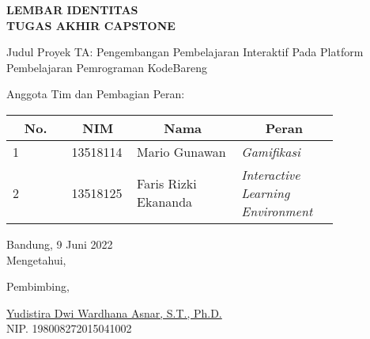 \clearpage
\pagestyle{empty}

\begin{center}
  \smallskip

  \Large \bfseries \MakeUppercase{Lembar Identitas \\ Tugas Akhir Capstone}
  \vspace{\baselineskip}

  \normalsize \normalfont
  \begin{flushleft}
    Judul Proyek TA\qquad: Pengembangan Pembelajaran Interaktif Pada Platform Pembelajaran Pemrograman KodeBareng
    \medskip

    Anggota Tim dan Pembagian Peran:
    \bigskip
  \end{flushleft}

  \begin{center}
    \begin{tabular}{ |l|p{0.2\linewidth}|p{0.325\linewidth}|p{0.3\linewidth}| }
      \hline
      \multicolumn{1}{|c|}{\textbf{No.}} & \multicolumn{1}{c|}{\textbf{NIM}} & \multicolumn{1}{c|}{\textbf{Nama}} & \multicolumn{1}{c|}{\textbf{Peran}}       \\
      \hline
      1                                  & 13518114                          & Mario Gunawan                      & \textit{Gamifikasi}                       \\
      \hline
      2                                  & 13518125                          & Faris Rizki Ekananda               & \textit{Interactive Learning Environment} \\
      \hline
    \end{tabular}
  \end{center}

  \vfill
  Bandung, 9 Juni 2022 \\
  Mengetahui,

  \vspace{0.5cm}
  Pembimbing,

  \vspace{2cm}
  \underline{Yudistira Dwi Wardhana Asnar, S.T., Ph.D.} \\
  NIP. 198008272015041002
  \vspace{3cm}

\end{center}
\clearpage
